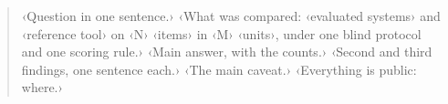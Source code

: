 \begin{abstract}
‹Question in one sentence.› ‹What was compared: ‹evaluated systems› and ‹reference tool› on ‹N› ‹items› in ‹M› ‹units›, under one blind protocol and one scoring rule.› ‹Main answer, with the counts.› ‹Second and third findings, one sentence each.› ‹The main caveat.› ‹Everything is public: where.›
\end{abstract}

